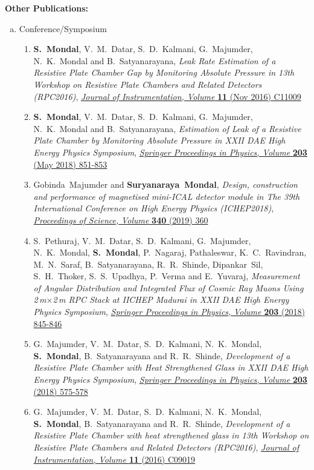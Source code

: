 \documentclass[a4paper,12pt,twoside]{article}
\begin{document}
\noindent\textbf{Other Publications:}
\begin{enumerate}[a.]
\item Conference/Symposium
  \begin{enumerate}[1)]
  \item \textbf{S.~Mondal}, V.~M.~Datar, S.~D.~Kalmani, G.~Majumder, N.~K.~Mondal and B.~Satyanarayana, \emph{Leak Rate Estimation of a Resistive Plate Chamber Gap by Monitoring Absolute Pressure in 13th Workshop on Resistive Plate Chambers and Related Detectors (RPC2016)}, \href{https://doi.org/10.1088/1748-0221/11/11/C11009}{\emph{Journal of Instrumentation, Volume } \textbf{11} (Nov 2016) C11009}
  \item \textbf{S.~Mondal}, V.~M.~Datar, S.~D.~Kalmani, G.~Majumder, N.~K.~Mondal and B.~Satyanarayana, \emph{Estimation of Leak of a Resistive Plate Chamber by Monitoring Absolute Pressure in XXII DAE High Energy Physics Symposium}, \href{https://doi.org/10.1007/978-3-319-73171-1_207}{\emph{Springer Proceedings in Physics, Volume } \textbf{203} (May 2018) 851-853}
  \item Gobinda~Majumder and \textbf{Suryanaraya~Mondal}, \emph{Design, construction and performance of magnetised mini-ICAL detector module in The 39th International Conference on High Energy Physics (ICHEP2018)}, \href{https://doi.org/10.22323/1.340.0360}{\emph{Proceedings of Science,} \textit{Volume} \textbf{340} (2019) 360}
  \item S.~Pethuraj, V.~M.~Datar, S.~D.~Kalmani, G.~Majumder, N.~K.~Mondal, \textbf{S.~Mondal}, P.~Nagaraj, Pathaleswar, K.~C.~Ravindran, M.~N.~Saraf, B.~Satyanarayana, R.~R.~Shinde, Dipankar~Sil, S.~H.~Thoker, S.~S.~Upadhya, P.~Verma and E.~Yuvaraj, \emph{Measurement of Angular Distribution and Integrated Flux of Cosmic Ray Muons Using 2\,m$\times$2\,m RPC Stack at IICHEP Madurai in XXII DAE High Energy Physics Symposium}, \href{https://doi.org/10.1007/978-3-319-73171-1_205}{\emph{Springer Proceedings in Physics,} \emph{Volume} \textbf{203} (2018) 845-846}
  \item G.~Majumder, V.~M.~Datar, S.~D.~Kalmani, N.~K.~Mondal, \textbf{S.~Mondal}, B.~Satyanarayana and R.~R.~Shinde, \emph{Development of a Resistive Plate Chamber with Heat Strengthened Glass in XXII DAE High Energy Physics Symposium}, \href{https://doi.org/10.1007/978-3-319-73171-1_135}{\emph{Springer Proceedings in Physics, Volume} \textbf{203} (2018) 575-578}
  \item  G.~Majumder, V.~M.~Datar, S.~D.~Kalmani, N.~K.~Mondal, \textbf{S.~Mondal}, B.~Satyanarayana and R.~R.~Shinde, \emph{Development of a Resistive Plate Chamber with heat strengthened glass in 13th Workshop on Resistive Plate Chambers and Related Detectors (RPC2016)}, \href{https://doi.org/10.1088/1748-0221/11/09/C09019}{\emph{Journal of Instrumentation, Volume} \textbf{11} (2016) C09019}

\end{enumerate}
\end{enumerate}
\end{document}
